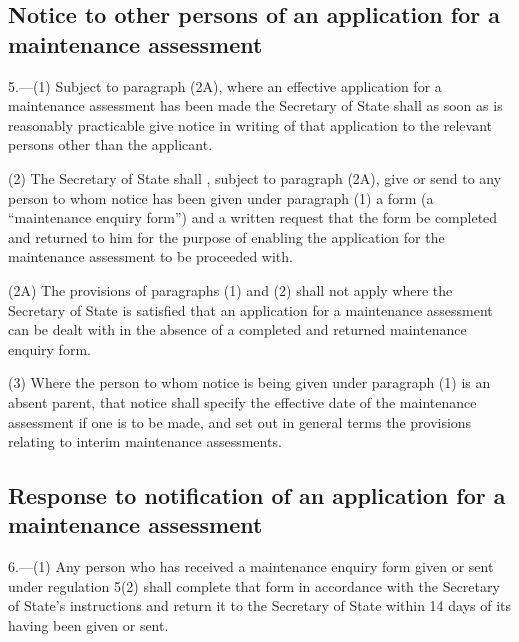 \documentclass[a4paper,12pt]{article}
\begin{document}
\subsection[5. Notice to other persons of an application for a maintenance assessment]{Notice to other persons of an application for a maintenance assessment}

5.—(1) 
Subject to paragraph (2A), where %
an effective application for a maintenance assessment has been made the Secretary of State shall as soon as is reasonably practicable give notice in writing of that application to the relevant persons other than the applicant.

(2) The Secretary of State shall%
, subject to paragraph (2A), %
 give or send to any person to whom notice has been given under paragraph (1) a form (a “maintenance enquiry form”) and a written request that the form be completed and returned to him for the purpose of enabling the application for the maintenance assessment to be proceeded with.

(2A) The provisions of paragraphs (1) and (2) shall not apply where the Secretary of State is satisfied that an application for a maintenance assessment can be dealt with in the absence of a completed and returned maintenance enquiry form. %

(3) Where the person to whom notice is being given under paragraph (1) is an absent parent, that notice shall specify the effective date of the maintenance assessment if one is to be made, and set out in general terms the provisions relating to interim maintenance assessments.


\subsection[6. Response to notification of an application for a maintenance assessment]{\sloppy Response to notification of an application for a maintenance assessment}

6.—(1) Any person who has received a maintenance enquiry form given or sent under regulation 5(2) shall complete that form in accordance with the Secretary of State’s instructions and return it to the Secretary of State within 14 days of its having been given or sent.
\end{document}
